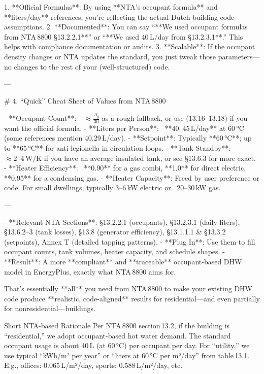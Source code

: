 1. **Official Formulas**: By using **NTA’s occupant formula** and **liters/day** references, you’re reflecting the actual Dutch building code assumptions.  
2. **Documented**: You can say “**We used occupant formulas from NTA 8800 \S13.2.2.1**” or “**We used 40 L/day from \S13.2.3.1**.” This helps with compliance documentation or audits.  
3. **Scalable**: If the occupant density changes or NTA updates the standard, you just tweak those parameters—no changes to the rest of your (well-structured) code.

---

# 4. “Quick” Cheat Sheet of Values from NTA 8800

- **Occupant Count**:  
  - \(\approx\frac{A_{g}}{30}\) as a rough fallback, or use (13.16–13.18) if you want the official formula.  
- **Liters per Person**: ~**40–45 L/day** at 60 °C (some references mention 40.29 L/day).  
- **Setpoint**: Typically **60 °C**; up to **65 °C** for anti‐legionella in circulation loops.  
- **Tank Standby**: \(\approx 2–4\,\text{W/K}\) if you have an average insulated tank, or see \S13.6.3 for more exact.  
- **Heater Efficiency**: ~**0.90** for a gas combi, **1.0** for direct electric, **0.95** for a condensing gas.  
- **Heater Capacity**: Freed by user preference or code. For small dwellings, typically 3–6 kW electric or ~20–30 kW gas.

---







- **Relevant NTA Sections**: \S13.2.2.1 (occupants), \S13.2.3.1 (daily liters), \S13.6.2–3 (tank losses), \S13.8 (generator efficiency), \S13.1.1.1 & \S13.3.2 (setpoints), Annex T (detailed tapping patterns).  
- **Plug In**: Use them to fill occupant counts, tank volumes, heater capacity, and schedule shapes.  
- **Result**: A more **compliant** and **traceable** occupant-based DHW model in EnergyPlus, exactly what NTA 8800 aims for.

That’s essentially **all** you need from NTA 8800 to make your existing DHW code produce **realistic, code-aligned** results for residential—and even partially for nonresidential—buildings.









Short NTA-based Rationale
Per NTA 8800 section 13.2, if the building is “residential,” we adopt occupant-based hot water demand. The standard occupant usage is about 40 L (at 60 °C) per occupant per day. For “utility,” we use typical “kWh/m² per year” or “liters at 60 °C per m²/day” from table 13.1. E.g., offices: 0.065 L/m²/day, sports: 0.588 L/m²/day, etc.



